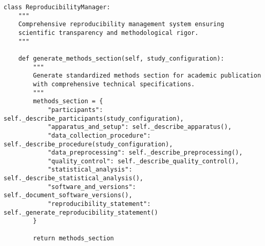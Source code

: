 \documentclass[11pt,a4paper]{article}
\begin{document}
\begin{verbatim}
class ReproducibilityManager:
    """
    Comprehensive reproducibility management system ensuring
    scientific transparency and methodological rigor.
    """

    def generate_methods_section(self, study_configuration):
        """
        Generate standardized methods section for academic publication
        with comprehensive technical specifications.
        """
        methods_section = {
            "participants": self._describe_participants(study_configuration),
            "apparatus_and_setup": self._describe_apparatus(),
            "data_collection_procedure": self._describe_procedure(study_configuration),
            "data_preprocessing": self._describe_preprocessing(),
            "quality_control": self._describe_quality_control(),
            "statistical_analysis": self._describe_statistical_analysis(),
            "software_and_versions": self._document_software_versions(),
            "reproducibility_statement": self._generate_reproducibility_statement()
        }

        return methods_section


\end{verbatim}
\end{document}
